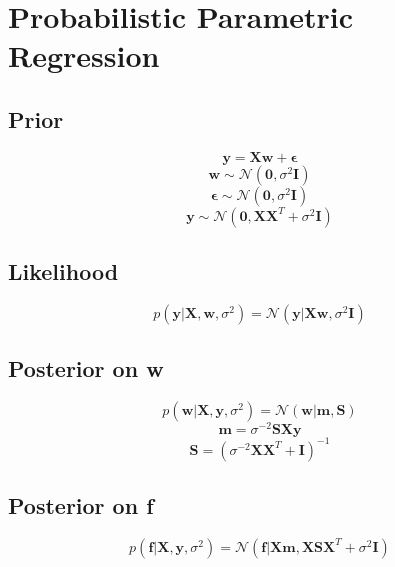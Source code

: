 \section{Probabilistic Parametric Regression}
\subsection[]{Prior}
\begin{equation}
    \mathbf{y} = \mathbf{X} \mathbf{w} + \mathbf{\epsilon}
\end{equation}
\begin{equation}
    \mathbf{w} \sim \mathcal{N}(\mathbf{0}, \sigma^2 \mathbf{I})
\end{equation}
\begin{equation}
    \mathbf{\epsilon} \sim \mathcal{N}(\mathbf{0}, \sigma^2 \mathbf{I})
\end{equation}
\begin{equation}
    \mathbf{y} \sim \mathcal{N}(\mathbf{0}, \mathbf{X} \mathbf{X}^T + \sigma^2 \mathbf{I})
\end{equation}

\subsection[]{Likelihood}
\begin{equation}
    p(\mathbf{y} | \mathbf{X}, \mathbf{w}, \sigma^2) = \mathcal{N}(\mathbf{y} | \mathbf{X} \mathbf{w}, \sigma^2 \mathbf{I})
\end{equation}

\subsection[]{Posterior on w}
\begin{equation}
    p(\mathbf{w} | \mathbf{X}, \mathbf{y}, \sigma^2) = \mathcal{N}(\mathbf{w} | \mathbf{m}, \mathbf{S})
\end{equation}
\begin{equation}
    \mathbf{m} = \sigma^{-2} \mathbf{S} \mathbf{X} \mathbf{y}
\end{equation}
\begin{equation}
    \mathbf{S} = (\sigma^{-2} \mathbf{X} \mathbf{X}^T + \mathbf{I})^{-1}
\end{equation}

\subsection[]{Posterior on f}
\begin{equation}
    p(\mathbf{f} | \mathbf{X}, \mathbf{y}, \sigma^2) = \mathcal{N}(\mathbf{f} | \mathbf{X} \mathbf{m}, \mathbf{X} \mathbf{S} \mathbf{X}^T + \sigma^2 \mathbf{I})
\end{equation}

